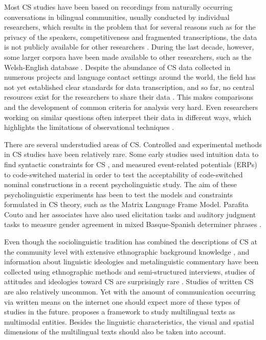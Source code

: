 \documentclass[output=paper,
modfonts
]{langscibook}
\begin{document}
Most CS studies have been based on recordings from naturally occurring conversations in bilingual communities, usually conducted by individual researchers, which results in the problem that for several reasons such as for the privacy of the speakers, competitiveness and fragmented transcriptions, the data is not publicly available for other researchers \parencite[pp. 23]{gullberg2009technique}. During the last decade, however, some larger corpora have been made available to other researchers, such as the Welsh-English database \citep{deuchar2014building}. Despite the abundance of CS data collected in numerous projects and language contact settings around the world, the field has not yet established clear standards for data transcription, and so far, no central resources exist for the researchers to share their data \parencite{gardner2009code}. This makes comparisons and the development of common criteria for analysis very hard. Even researchers working on similar questions often interpret their data in different ways, which highlights the limitations of observational techniques \parencite{gullberg2009technique}.

There are several understudied areas of CS. Controlled and experimental methods in CS studies have been relatively rare. Some early studies used intuition data to find syntactic constraints for CS \parencite[pp. 22]{gullberg2009technique}, and \cite{couto2017chapter} measured event-related potentials (ERPs) to code-switched material in order to test the acceptability of code-switched nominal constructions in a recent psycholinguistic study. The aim of these psycholinguistic experiments has been to test the models and constraints formulated in CS theory, such as the Matrix Language Frame Model. Parafita Couto and her associates have also used  elicitation tasks and auditory judgment tasks to measure gender agreement in mixed Basque-Spanish determiner phrases \parencite{couto2016gender}.

Even though the sociolinguistic tradition has combined the descriptions of CS at the community level with extensive ethnographic background knowledge \parencite[pp. 18]{gardner2009code}, and information about linguistic ideologies and metalinguistic commentary have been collected using ethnographic methods and semi-structured interviews, studies of attitudes and ideologies toward CS are surprisingly rare \parencite{gardner2009code, garrett2010attitudes}. Studies of written CS are also relatively uncommon. Yet with the amount of communication occurring via written means on the internet one should expect more of these types of studies in the future. \cite{sebba2013multilingualism} proposes a framework to study multilingual texts as multimodal entities. Besides the linguistic characteristics, the visual and spatial dimensions of the multilingual texts should also be taken into account.
\end{document}
